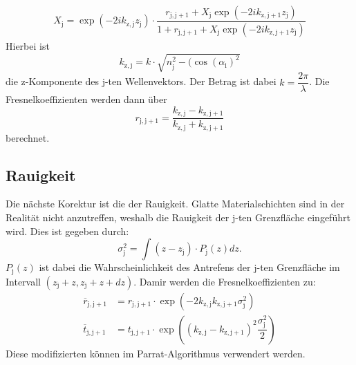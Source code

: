 \begin{align}
  \label{eqn:Parrat-Algorithmus}
X_\mathrm{j}= \exp(-2i k_\mathrm{z,j}z_\mathrm{j})\cdot\dfrac{r_\mathrm{j,j+1}+X_\mathrm{j}\exp(-2i k_\mathrm{z,j+1}z_\mathrm{j})}{1+r_\mathrm{j,j+1}+X_\mathrm{j}\exp(-2i k_\mathrm{z,j+1}z_\mathrm{j})}
\end{align}
Hierbei ist
\begin{equation}
  \label{eqn:kzj}
 k_\mathrm{z,j}= k\cdot\sqrt{n_\mathrm{j}^2-(\cos(\alpha_\mathrm{i})^2}
\end{equation}
die z-Komponente des j-ten Wellenvektors. Der Betrag ist dabei $k=\dfrac{2\pi}{\lambda}$. Die Fresnelkoeffizienten werden dann über
\begin{equation}
  \label{eqn:Veränderten Fresnelkoefizienten}
  r_\mathrm{j,j+1}= \dfrac{k_\mathrm{z,j}-k_\mathrm{z,j+1}}{ k_\mathrm{z,j}+ k_\mathrm{z,j+1}}
\end{equation}
berechnet.
\subsection{Rauigkeit}
\label{sec:Rauigkeit}
Die nächste Korektur ist die der Rauigkeit. Glatte Materialschichten sind in der Realität nicht anzutreffen, weshalb die Rauigkeit der j-ten Grenzfläche eingeführt wird. Dies ist gegeben durch:
\begin{equation}
  \label{eqn:rms}
\sigma_\mathrm{j}^2= \int (z-z_\mathrm{j})\cdot P_\mathrm{j}(z) dz.
\end{equation}
$P_\mathrm{j}(z)$ ist dabei die Wahrscheinlichkeit des Antrefens der j-ten Grenzfläche im Intervall $(z_\mathrm{j}+z,z_\mathrm{j}+z+dz)$.
Damir werden die Fresnelkoeffizienten zu:
\begin{align}
  \label{eqn:modkoeff}
  \overline{r}_\mathrm{j,j+1}&=r_\mathrm{j,j+1}\cdot\exp(-2 k_\mathrm{z,j} k_\mathrm{z,j+1}\sigma_\mathrm{j}^2) \\
  \label{eqn:modkoeff2}
  \overline{t}_\mathrm{j,j+1}&=t_\mathrm{j,j+1}\cdot\exp\left(( k_\mathrm{z,j}-k_\mathrm{z,j+1})^2 \dfrac{\sigma_\mathrm{j}^2}{2}\right)
\end{align}
Diese modifizierten können im Parrat-Algorithmus verwendert werden.
